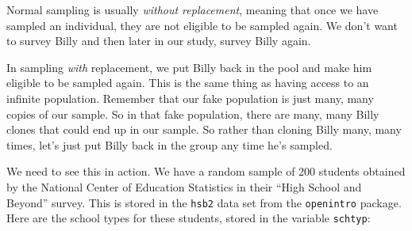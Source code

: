\documentclass[
]{book}
\newenvironment{Shaded}{\begin{snugshade}}{\end{snugshade}}
\newcommand{\NormalTok}[1]{#1}
\newcommand{\SpecialCharTok}[1]{\textcolor[rgb]{0.00,0.00,0.00}{#1}}
\begin{document}
Normal sampling is usually \emph{without replacement}, meaning that once we have sampled an individual, they are not eligible to be sampled again. We don't want to survey Billy and then later in our study, survey Billy again.

In sampling \emph{with} replacement, we put Billy back in the pool and make him eligible to be sampled again. This is the same thing as having access to an infinite population. Remember that our fake population is just many, many copies of our sample. So in that fake population, there are many, many Billy clones that could end up in our sample. So rather than cloning Billy many, many times, let's just put Billy back in the group any time he's sampled.

We need to see this in action. We have a random sample of 200 students obtained by the National Center of Education Statistics in their ``High School and Beyond'' survey. This is stored in the \texttt{hsb2} data set from the \texttt{openintro} package. Here are the school types for these students, stored in the variable \texttt{schtyp}:

\begin{Shaded}
\end{Shaded}
\end{document}
